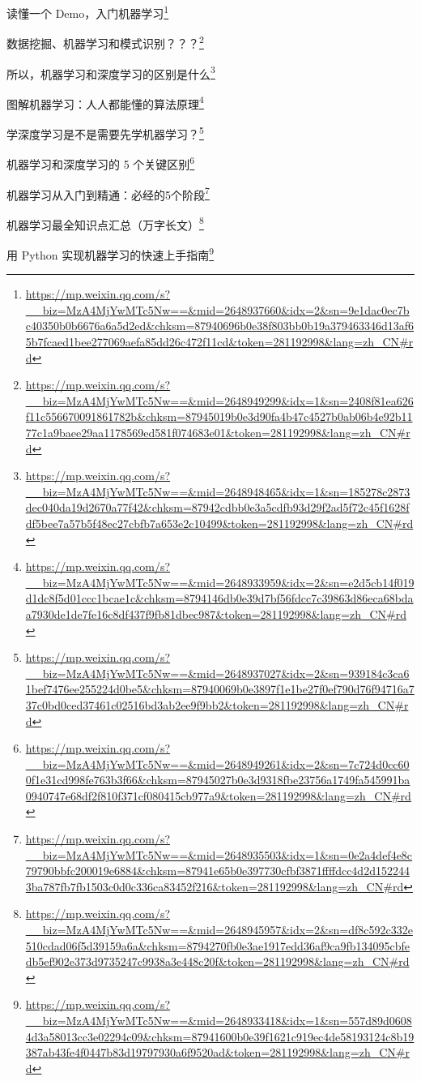 \documentclass[]{ctexbook}
\renewcommand{\href}[2]{#2\footnote{\url{#1}}}
\begin{document}
\href{https://mp.weixin.qq.com/s?__biz=MzA4MjYwMTc5Nw==\&mid=2648937660\&idx=2\&sn=9e1dac0ec7bc40350b0b6676a6a5d2ed\&chksm=87940696b0e38f803bb0b19a379463346d13af65b7fcaed1bee277069aefa85dd26c472f11cd\&token=281192998\&lang=zh_CN\#rd}{读懂一个 Demo，入门机器学习}

\href{https://mp.weixin.qq.com/s?__biz=MzA4MjYwMTc5Nw==\&mid=2648949299\&idx=1\&sn=2408f81ea626f11c556670091861782b\&chksm=87945019b0e3d90fa4b47c4527b0ab06b4e92b1177c1a9baee29aa1178569ed581f074683e01\&token=281192998\&lang=zh_CN\#rd}{数据挖掘、机器学习和模式识别？？？}

\href{https://mp.weixin.qq.com/s?__biz=MzA4MjYwMTc5Nw==\&mid=2648948465\&idx=1\&sn=185278c2873dec040da19d2670a77f42\&chksm=87942cdbb0e3a5cdfb93d29f2ad5f72c45f1628fdf5bee7a57b5f48ec27cbfb7a653e2c10499\&token=281192998\&lang=zh_CN\#rd}{所以，机器学习和深度学习的区别是什么}

\href{https://mp.weixin.qq.com/s?__biz=MzA4MjYwMTc5Nw==\&mid=2648933959\&idx=2\&sn=e2d5cb14f019d1dc8f5d01ccc1bcae1c\&chksm=8794146db0e39d7bf56fdcc7c39863d86eca68bdaa7930de1de7fe16c8df437f9fb81dbec987\&token=281192998\&lang=zh_CN\#rd}{图解机器学习：人人都能懂的算法原理}

\href{https://mp.weixin.qq.com/s?__biz=MzA4MjYwMTc5Nw==\&mid=2648937027\&idx=2\&sn=939184c3ca61bef7476ee255224d0be5\&chksm=87940069b0e3897f1e1be27f0ef790d76f94716a737c0bd0ced37461c02516bd3ab2ee9f9bb2\&token=281192998\&lang=zh_CN\#rd}{学深度学习是不是需要先学机器学习？}

\href{https://mp.weixin.qq.com/s?__biz=MzA4MjYwMTc5Nw==\&mid=2648949261\&idx=2\&sn=7c724d0cc600f1e31cd998fe763b3f66\&chksm=87945027b0e3d9318fbe23756a1749fa545991ba0940747e68df2f810f371cf080415cb977a9\&token=281192998\&lang=zh_CN\#rd}{机器学习和深度学习的 5 个关键区别}

\href{https://mp.weixin.qq.com/s?__biz=MzA4MjYwMTc5Nw==\&mid=2648935503\&idx=1\&sn=0e2a4def4e8c79790bbfc200019e6884\&chksm=87941e65b0e397730cfbf3871ffffdcc4d2d1522443ba787fb7fb1503c0d0c336ca83452f216\&token=281192998\&lang=zh_CN\#rd}{机器学习从入门到精通：必经的5个阶段}

\href{https://mp.weixin.qq.com/s?__biz=MzA4MjYwMTc5Nw==\&mid=2648945957\&idx=2\&sn=df8c592c332e510cdad06f5d39159a6a\&chksm=8794270fb0e3ae1917edd36af9ca9fb134095cbfedb5ef902e373d9735247c9938a3e448c20f\&token=281192998\&lang=zh_CN\#rd}{机器学习最全知识点汇总（万字长文）}

\href{https://mp.weixin.qq.com/s?__biz=MzA4MjYwMTc5Nw==\&mid=2648933418\&idx=1\&sn=557d89d06084d3a58013cc3e02294c09\&chksm=87941600b0e39f1621c919ec4de58193124c8b19387ab43fe4f0447b83d19797930a6f9520ad\&token=281192998\&lang=zh_CN\#rd}{用 Python 实现机器学习的快速上手指南}
\end{document}
